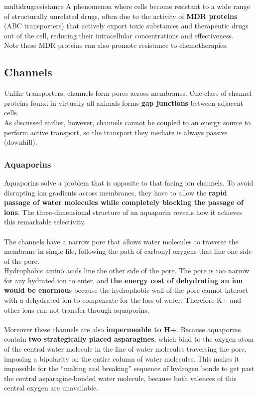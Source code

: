 \documentclass[../main.tex]{subfiles}
\begin{document}
\begin{RemarkWithTitel}{\gls{multidrugresistance}}
	A phenomenon where cells become resistant to a wide range of structurally unrelated drugs, often due to the activity of \textbf{MDR proteins} (ABC transporters) that actively export toxic substances and therapeutic drugs out of the cell, reducing their intracellular concentrations and effectiveness.\\
	Note these MDR proteins can also promote resistance to chemotherapies. 
\end{RemarkWithTitel}

\subsection{Channels} 
Unlike transporters, channels form pores across membranes. One class of channel proteins found in virtually all animals forms \textbf{gap junctions} between adjacent cells.\\
As discussed earlier, however, channels cannot be coupled to an energy source to perform active transport, so the transport they mediate is always passive (downhill).

\subsubsection{Aquaporins}
Aquaporins solve a problem that is opposite to that facing ion channels. To avoid disrupting ion gradients across membranes, they have to allow the \textbf{rapid passage of water molecules while completely blocking the passage of ions}. The three-dimensional structure of an aquaporin reveals how it achieves this remarkable selectivity. \\
\\
The channels have a narrow pore that allows water molecules to traverse the membrane in single file, following the path of carbonyl oxygens that line one side of the pore. \\
Hydrophobic amino acids line the other side of the pore. The pore is too narrow for any hydrated ion to enter, and \textbf{the energy cost of dehydrating an ion would be enormou}s because the hydrophobic wall of the pore cannot interact with a dehydrated ion to compensate for the loss of water. Therefore K+ and other ions can not transfer through aquaporins. \\
\\
Moreover these channels are also \textbf{impermeable to H+}. Because aquaporins contain \textbf{two strategically placed asparagines}, which bind to the oxygen atom of the central water molecule in the line of water molecules traversing the pore, imposing a bipolarity on the entire column of water molecules. This makes it impossible for the “making and breaking” sequence of hydrogen bonds to get past the central asparagine-bonded water molecule, because both valences of this central oxygen are unavailable. 
\end{document}

